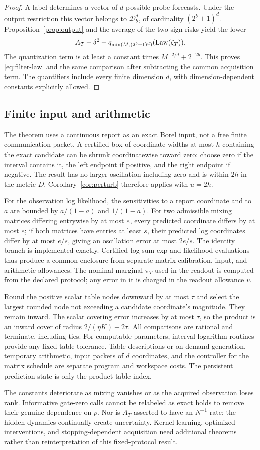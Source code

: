 \begin{proof}
A label determines a vector of $d$ possible probe forecasts. Under the output restriction this vector belongs to $\mathcal D_b^d$, of cardinality $(2^b+1)^d$. Proposition~\ref{prop:output} and the average of the two sign risks yield the lower
\[
 A_T+\delta^2+q_{\min(M,(2^b+1)^d)}(\operatorname{Law}(\zeta_T)).
\]
The quantization term is at least a constant times $M^{-2/d}+2^{-2b}$. This proves \eqref{eq:filter-law} and the same comparison after subtracting the common acquisition term. The quantifiers include every finite dimension $d$, with dimension-dependent constants explicitly allowed.
\end{proof}

\subsection{Finite input and arithmetic}
The theorem uses a continuous report as an exact Borel input, not a free finite communication packet. A certified box of coordinate widths at most $h$ containing the exact candidate can be shrunk coordinatewise toward zero: choose zero if the interval contains it, the left endpoint if positive, and the right endpoint if negative. The result has no larger oscillation including zero and is within $2h$ in the metric $D$. Corollary~\ref{cor:perturb} therefore applies with $u=2h$.

For the observation log likelihood, the sensitivities to a report coordinate and to $a$ are bounded by $a/(1-a)$ and $1/(1-a)$. For two admissible mixing matrices differing entrywise by at most $e$, every predicted coordinate differs by at most $e$; if both matrices have entries at least $s$, their predicted log coordinates differ by at most $e/s$, giving an oscillation error at most $2e/s$. The identity branch is implemented exactly. Certified log-sum-exp and likelihood evaluations thus produce a common enclosure from separate matrix-calibration, input, and arithmetic allowances. The nominal marginal $\pi_T$ used in the readout is computed from the declared protocol; any error in it is charged in the readout allowance $v$.

Round the positive scalar table nodes downward by at most $\tau$ and select the largest rounded node not exceeding a candidate coordinate's magnitude. They remain inward. The scalar covering error increases by at most $\tau$, so the product is an inward cover of radius $2/(\eta K)+2\tau$. All comparisons are rational and terminate, including ties. For computable parameters, interval logarithm routines provide any fixed table tolerance. Table descriptions or on-demand generation, temporary arithmetic, input packets of $d$ coordinates, and the controller for the matrix schedule are separate program and workspace costs. The persistent prediction state is only the product-table index.

The constants deteriorate as mixing vanishes or as the acquired observation loses rank. Informative gate-zero calls cannot be relabeled as exact holds to remove their genuine dependence on $p$. Nor is $A_T$ asserted to have an $N^{-1}$ rate: the hidden dynamics continually create uncertainty. Kernel learning, optimized interventions, and stopping-dependent acquisition need additional theorems rather than reinterpretation of this fixed-protocol result.
